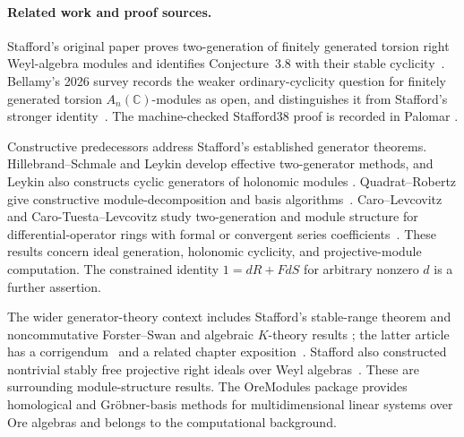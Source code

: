 % 

\paragraph{Related work and proof sources.}
Stafford's original paper proves two-generation of finitely generated torsion
right Weyl-algebra modules and identifies Conjecture~3.8 with their stable
cyclicity~\cite[Theorem~3.7 and pp.~437--438]{Stafford1978}.
Bellamy's 2026 survey records the weaker ordinary-cyclicity question for
finitely generated torsion $A_n(\mathbb C)$-modules as open, and distinguishes
it from Stafford's stronger identity~\cite[Section~3, Conjecture~3.4]{Bellamy2026}.
The machine-checked Stafford38 proof is recorded in Palomar
\cite{Stafford38Palomar2026,Stafford38Zenodo120}.

Constructive predecessors address Stafford's established generator theorems.
Hillebrand--Schmale and Leykin develop effective two-generator methods, and
Leykin also constructs cyclic generators of holonomic modules
\cite{HillebrandSchmale2001,Leykin2004}. Quadrat--Robertz give constructive
module-decomposition and basis algorithms~\cite{QuadratRobertz2007,
QuadratRobertz2014}. Caro--Levcovitz and Caro-Tuesta--Levcovitz study
two-generation and module structure for differential-operator rings with
formal or convergent series coefficients~\cite{CaroLevcovitz2010,
CaroTuestaLevcovitz2020}. These results concern ideal generation, holonomic
cyclicity, and projective-module computation. The constrained identity
$1=dR+FdS$ for arbitrary nonzero $d$ is a further assertion.

The wider generator-theory context includes Stafford's stable-range theorem
and noncommutative Forster--Swan and algebraic $K$-theory results
\cite{StaffordStableRange1981,StaffordGenerating1981}; the latter article
has a corrigendum~\cite{StaffordGeneratingCorrigendum1983} and a related
chapter exposition~\cite{StaffordGeneratingChapter1982}. Stafford also
constructed nontrivial stably free projective right ideals over Weyl
algebras~\cite{StaffordStablyFree1985}. These are surrounding module-structure
results. The OreModules package provides homological and Gr\"obner-basis
methods for multidimensional linear systems over Ore algebras
\cite{OreModules2007} and belongs to the computational background.

